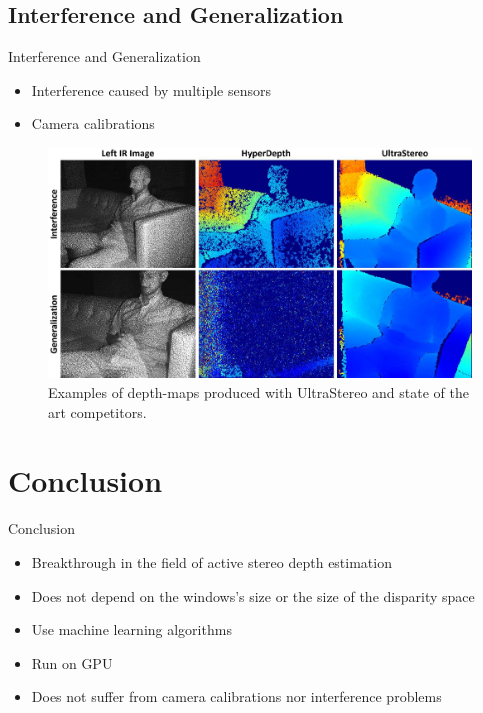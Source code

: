 \subsection{Interference and Generalization}

\begin{frame}{Interference and Generalization}
\begin{itemize}
\item Interference caused by multiple sensors
\item Camera calibrations
\end{itemize}
\begin{figure}
\includegraphics[scale=0.1]{pictures/fig8}
\caption{Examples of depth-maps produced with UltraStereo and state of the art competitors.}
\end{figure}
\end{frame}

\section{Conclusion}
\begin{frame}{Conclusion}
\begin{itemize}
\item Breakthrough in the field of active stereo depth estimation 
\item Does not depend on the windows's size or the size of the disparity space
\item Use machine learning algorithms
\item Run on GPU
\item Does not suffer from camera calibrations nor interference problems
\end{itemize}
\end{frame}
